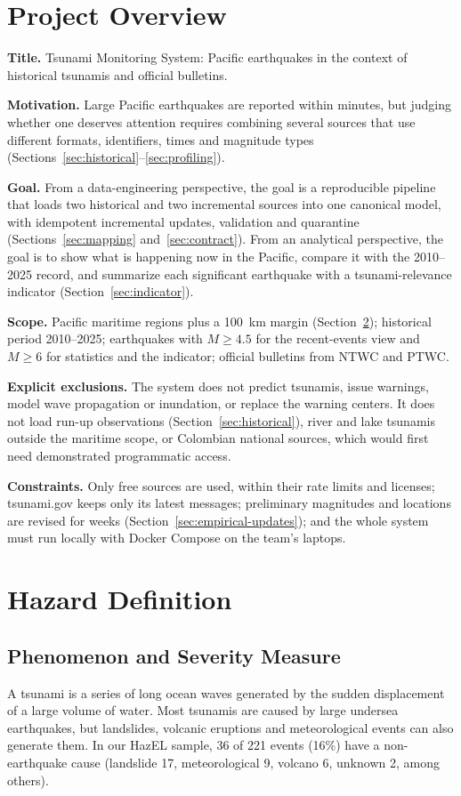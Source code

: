 \documentclass[a4paper,11pt,oneside]{book}
\begin{document}
\section{Project Overview}
\textbf{Title.} Tsunami Monitoring System: Pacific earthquakes in the context of historical tsunamis and official bulletins.

\textbf{Motivation.} Large Pacific earthquakes are reported within minutes, but judging whether one deserves attention requires combining several sources that use different formats, identifiers, times and magnitude types (Sections~\ref{sec:historical}--\ref{sec:profiling}).

\textbf{Goal.} From a data-engineering perspective, the goal is a reproducible pipeline that loads two historical and two incremental sources into one canonical model, with idempotent incremental updates, validation and quarantine (Sections~\ref{sec:mapping} and~\ref{sec:contract}).
From an analytical perspective, the goal is to show what is happening now in the Pacific, compare it with the 2010--2025 record, and summarize each significant earthquake with a tsunami-relevance indicator (Section~\ref{sec:indicator}).

\textbf{Scope.} Pacific maritime regions plus a 100~km margin (Section~\ref{sec:hazard}); historical period 2010--2025; earthquakes with $M \geq 4.5$ for the recent-events view and $M \geq 6$ for statistics and the indicator; official bulletins from NTWC and PTWC.

\textbf{Explicit exclusions.} The system does not predict tsunamis, issue warnings, model wave propagation or inundation, or replace the warning centers.
It does not load run-up observations (Section~\ref{sec:historical}), river and lake tsunamis outside the maritime scope, or Colombian national sources, which would first need demonstrated programmatic access.

\textbf{Constraints.} Only free sources are used, within their rate limits and licenses; tsunami.gov keeps only its latest messages; preliminary magnitudes and locations are revised for weeks (Section~\ref{sec:empirical-updates}); and the whole system must run locally with Docker Compose on the team's laptops.

\section{Hazard Definition}
\label{sec:hazard}

\subsection{Phenomenon and Severity Measure}
\label{sec:severity}
A tsunami is a series of long ocean waves generated by the sudden displacement of a large volume of water.
Most tsunamis are caused by large undersea earthquakes, but landslides, volcanic eruptions and meteorological events can also generate them.
In our HazEL sample, 36 of 221 events (16\%) have a non-earthquake cause (landslide 17, meteorological 9, volcano 6, unknown 2, among others).
\end{document}
